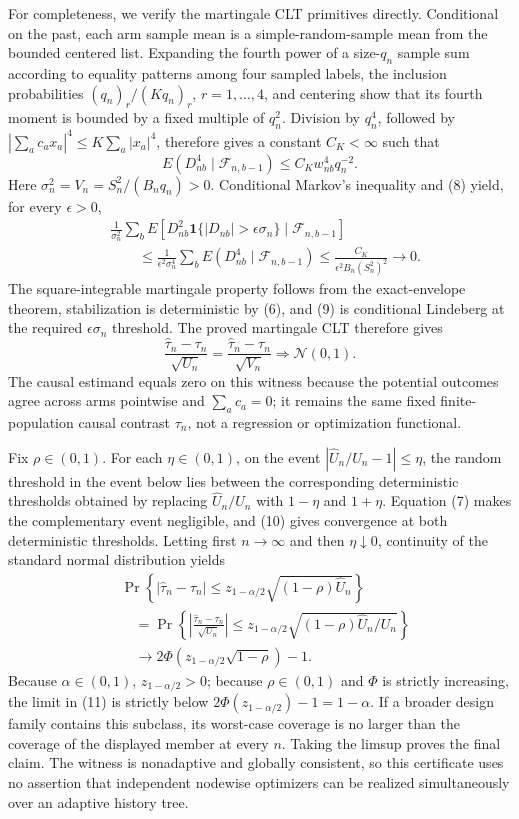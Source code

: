 For completeness, we verify the martingale CLT primitives directly. Conditional on the past, each arm sample mean is a simple-random-sample mean from the bounded centered list. Expanding the fourth power of a size-\(q_n\) sample sum according to equality patterns among four sampled labels, the inclusion probabilities \((q_n)_r/(Kq_n)_r\), \(r=1,\ldots,4\), and centering show that its fourth moment is bounded by a fixed multiple of \(q_n^2\). Division by \(q_n^4\), followed by \(|\sum_ac_ax_a|^4\le K\sum_a|x_a|^4\), therefore gives a constant \(C_K<\infty\) such that
\[
E(D_{nb}^4\mid\mathcal F_{n,b-1})\le C_Kw_{nb}^4q_n^{-2}.
\tag{8}
\]
Here \(\sigma_n^2=V_n=S_n^2/(B_nq_n)>0\). Conditional Markov's inequality and (8) yield, for every \(\epsilon>0\),
\[
\begin{aligned}
&\frac1{\sigma_n^2}\sum_bE\left[D_{nb}^2
\mathbf1\{|D_{nb}|>\epsilon\sigma_n\}\mid\mathcal F_{n,b-1}\right]\\
&\qquad\le\frac1{\epsilon^2\sigma_n^4}\sum_bE(D_{nb}^4\mid\mathcal F_{n,b-1})
\le\frac{C_K}{\epsilon^2B_n(S_n^2)^2}\longrightarrow0.
\end{aligned}
\tag{9}
\]
The square-integrable martingale property follows from the exact-envelope theorem, stabilization is deterministic by (6), and (9) is conditional Lindeberg at the required \(\epsilon\sigma_n\) threshold. The proved martingale CLT therefore gives
\[
\frac{\widehat\tau_n-\tau_n}{\sqrt{U_n}}
=\frac{\widehat\tau_n-\tau_n}{\sqrt{V_n}}
\Rightarrow\mathcal N(0,1).
\tag{10}
\]
The causal estimand equals zero on this witness because the potential outcomes agree across arms pointwise and \(\sum_ac_a=0\); it remains the same fixed finite-population causal contrast \(\tau_n\), not a regression or optimization functional.

Fix \(\rho\in(0,1)\). For each \(\eta\in(0,1)\), on the event \(|\widehat U_n/U_n-1|\le\eta\), the random threshold in the event below lies between the corresponding deterministic thresholds obtained by replacing \(\widehat U_n/U_n\) with \(1-\eta\) and \(1+\eta\). Equation (7) makes the complementary event negligible, and (10) gives convergence at both deterministic thresholds. Letting first \(n\to\infty\) and then \(\eta\downarrow0\), continuity of the standard normal distribution yields
\[
\begin{aligned}
&\Pr\!\left\{|\widehat\tau_n-\tau_n|
\le z_{1-\alpha/2}\sqrt{(1-\rho)\widehat U_n}\right\}\\
&\quad=\Pr\!\left\{
\left|\frac{\widehat\tau_n-\tau_n}{\sqrt{U_n}}\right|
\le z_{1-\alpha/2}\sqrt{(1-\rho)\widehat U_n/U_n}\right\}\\
&\quad\longrightarrow
2\Phi\!\left(z_{1-\alpha/2}\sqrt{1-\rho}\right)-1.
\end{aligned}
\tag{11}
\]
Because \(\alpha\in(0,1)\), \(z_{1-\alpha/2}>0\); because \(\rho\in(0,1)\) and \(\Phi\) is strictly increasing, the limit in (11) is strictly below
\(2\Phi(z_{1-\alpha/2})-1=1-\alpha\). If a broader design family contains this subclass, its worst-case coverage is no larger than the coverage of the displayed member at every \(n\). Taking the limsup proves the final claim. The witness is nonadaptive and globally consistent, so this certificate uses no assertion that independent nodewise optimizers can be realized simultaneously over an adaptive history tree.